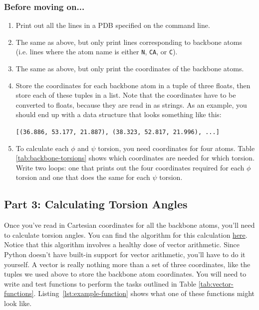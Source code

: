 \documentclass{article}
\newcommand{\bbphi}{\ensuremath{\phi}}
\newcommand{\bbpsi}{\ensuremath{\psi}}
\newenvironment{problems}
{\subsubsection{Before moving on...} \begin{enumerate}}
{\end{enumerate}}
\begin{document}
\begin{problems}
 \item Print out all the lines in a PDB specified on the command line.

 \item The same as above, but only print lines corresponding to backbone atoms 
  (i.e. lines where the atom name is either \texttt{N}, \texttt{CA}, or 
  \texttt{C}).

 \item The same as above, but only print the coordinates of the backbone atoms.

 \item Store the coordinates for each backbone atom in a tuple of three floats, 
  then store each of these tuples in a list.  Note that the coordinates have to 
  be converted to floats, because they are read in as strings.  As an example, 
  you should end up with a data structure that looks something like this: 

  \texttt{[(36.886, 53.177, 21.887), (38.323, 52.817, 21.996), ...]}

 \item To calculate each \bbphi{} and \bbpsi{} torsion, you need coordinates 
  for four atoms.  Table \ref{tab:backbone-torsions} shows which coordinates 
  are needed for which torsion.  Write two loops: one that prints out the four 
  coordinates required for each \bbphi{} torsion and one that does the same for 
  each \bbpsi{} torsion.

\end{problems}

\subsection{Part 3: Calculating Torsion Angles}

Once you've read in Cartesian coordinates for all the backbone atoms, you'll 
need to calculate torsion angles.  You can find the algorithm for this 
calculation 
\href{http://math.stackexchange.com/questions/47059/how-do-i-calculate-a-dihedral-angle-given-cartesian-coordinates}{here}.  
Notice that this algorithm involves a healthy dose of vector arithmetic.  Since 
Python doesn't have built-in support for vector arithmetic, you'll have to do 
it  yourself.  A vector is really nothing more than a set of three coordinates, 
like the tuples we used above to store the backbone atom coordinates.  You will 
need to write and test functions to perform the tasks outlined in Table 
\ref{tab:vector-functions}.  Listing\ \ref{lst:example-function} shows what one 
of these functions might look like.
\end{document}

